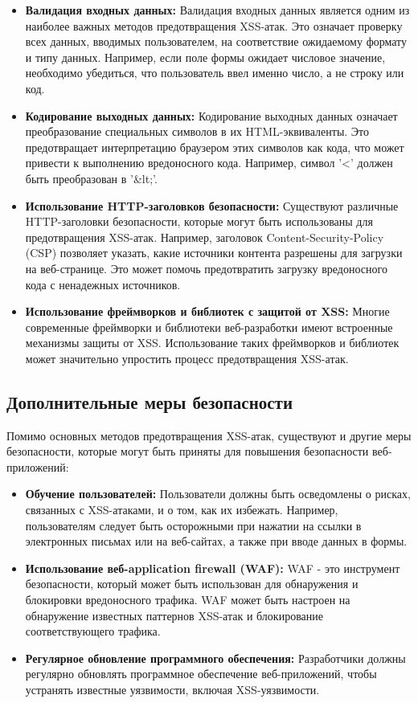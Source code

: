 \documentclass[a4paper,12pt]{diplom}
\begin{document}
	 \begin{itemize}
	 	\item \textbf{Валидация входных данных:}  Валидация входных данных является одним из наиболее важных методов предотвращения XSS-атак.  Это означает проверку всех данных,  вводимых пользователем,  на соответствие ожидаемому формату и типу данных.  Например,  если поле формы ожидает числовое значение,  необходимо убедиться,  что пользователь ввел именно число,  а не строку или код. 
	 	\item \textbf{Кодирование выходных данных:}  Кодирование выходных данных означает преобразование специальных символов в их HTML-эквиваленты.  Это предотвращает интерпретацию браузером этих символов как кода,  что может привести к выполнению вредоносного кода.  Например,  символ '<' должен быть преобразован в '\&lt;'. 
	 	\item \textbf{Использование HTTP-заголовков безопасности:}  Существуют различные HTTP-заголовки безопасности,  которые могут быть использованы для предотвращения XSS-атак.  Например,  заголовок Content-Security-Policy (CSP) позволяет указать,  какие источники контента разрешены для загрузки на веб-странице.  Это может помочь предотвратить загрузку вредоносного кода с ненадежных источников. 
	 	\item \textbf{Использование фреймворков и библиотек с защитой от XSS:}  Многие современные фреймворки и библиотеки веб-разработки имеют встроенные механизмы защиты от XSS.  Использование таких фреймворков и библиотек может значительно упростить процесс предотвращения XSS-атак. 
	 \end{itemize}
	 
	 \subsection{Дополнительные меры безопасности}
	 
	 Помимо основных методов предотвращения XSS-атак, существуют и другие меры безопасности, которые могут быть приняты для повышения безопасности веб-приложений:
	 
	 \begin{itemize}
	 	\item \textbf{Обучение пользователей:}  Пользователи должны быть осведомлены о рисках,  связанных с XSS-атаками,  и о том,  как их избежать.  Например,  пользователям следует быть осторожными при нажатии на ссылки в электронных письмах или на веб-сайтах,  а также при вводе данных в формы. 
	 	\item \textbf{Использование веб-application firewall (WAF):}  WAF - это инструмент безопасности,  который может быть использован для обнаружения и блокировки вредоносного трафика.  WAF может быть настроен на обнаружение известных паттернов XSS-атак и блокирование соответствующего трафика. 
	 	\item \textbf{Регулярное обновление программного обеспечения:}  Разработчики должны регулярно обновлять программное обеспечение веб-приложений,  чтобы устранять известные уязвимости,  включая XSS-уязвимости. 
	 \end{itemize}
	 
\end{document}
